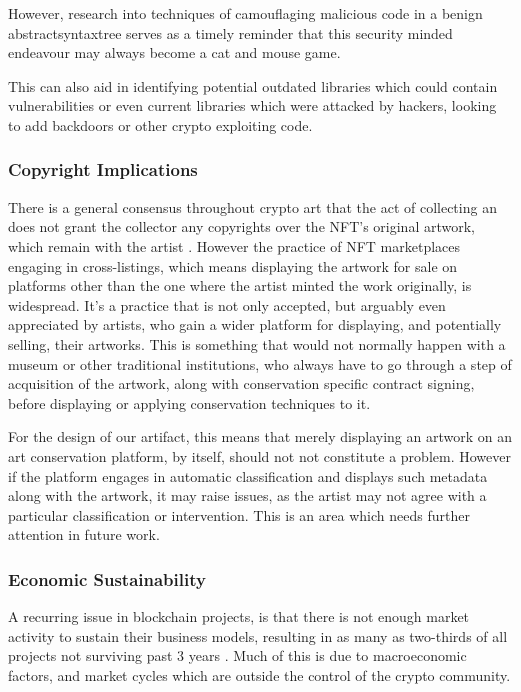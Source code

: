 However, research into techniques of camouflaging malicious code in a benign \gls{abstractsyntaxtree}
\cite{fassHideNoSeekCamouflagingMalicious2019} serves as a timely reminder that this security minded endeavour may always become a cat and mouse game.


This can also aid in identifying potential outdated libraries which could contain vulnerabilities or even current libraries which were attacked by hackers, looking to add backdoors or other crypto exploiting code.

\subsubsection{Copyright Implications}
\label{subsec:chap2_copyright}

There is a general consensus throughout crypto art that the act of collecting an  does not grant the collector any copyrights over the NFT's original artwork, which remain with the artist \cite{caglayanaksoyNFTsCopyrightChallenges2021a}. However the practice of NFT marketplaces engaging in cross-listings, which means displaying the artwork for sale on platforms other than the one where the artist minted the work originally, is widespread. It's a practice that is not only accepted, but arguably even appreciated by artists, who gain a wider platform for displaying, and potentially selling, their artworks. This is something that would not normally happen with a museum or other traditional institutions, who always have to go through a step of acquisition of the artwork, along with conservation specific contract signing, before displaying or applying conservation techniques to it.

For the design of our artifact, this means that merely displaying an artwork on an art conservation platform, by itself, should not not constitute a problem. However if the platform engages in automatic classification and displays such metadata along with the artwork, it may raise issues, as the artist may not agree with a particular classification or intervention. This is an area which needs further attention in future work.


\subsubsection{Economic Sustainability}

A recurring issue in blockchain projects, is that there is not enough market activity to sustain their business models, resulting in as many as two-thirds of all projects not surviving past 3 years \cite{franjkovicCryptocurrencyGraveyardTwoThirds2024}. Much of this is due to macroeconomic factors, and market cycles which are outside the control of the crypto community.

